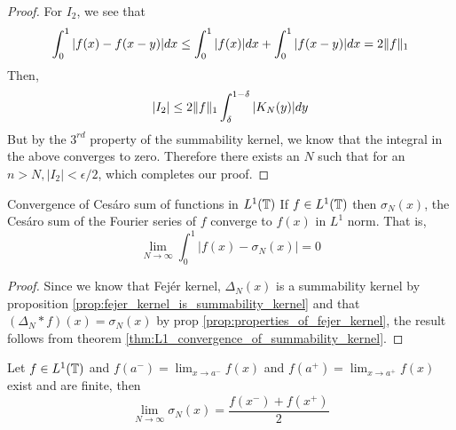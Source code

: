 \begin{proof}
    For $I_2$, we see that 
    \begin{displaymath}
      \int_0^1 |f(x) - f(x-y)|dx \le \int_0^1 |f(x)| dx + \int_0^1 |f(x-y)| dx = 2\lVert f\rVert_1
    \end{displaymath}
  Then,
  \begin{displaymath}
    |I_2| \le 2\lVert f\rVert_1 \int_{\delta}^{1-\delta} |K_N(y)|dy
  \end{displaymath}
But by the $3^{rd}$ property of the summability kernel, we know that the integral in the above converges to zero. Therefore there exists an $N$ such that for an $n>N, |I_2|< \epsilon/2$, which completes our proof.
  \end{proof}

  \begin{corollary}{Convergence of Ces\'aro sum of functions in $L^1(\mathbb T)$}
    If $f\in L^1(\mathbb T)$ then $\sigma_N(x)$, the Ces\'aro sum of the Fourier series of $f$ converge to $f(x)$ in $L^1$ norm. That is, 
    \begin{displaymath}
      \lim_{N\to \infty} \int_0^1 \left|f(x) - \sigma_N(x)\right| = 0
    \end{displaymath}
  \end{corollary}
  \begin{proof}
    Since we know that Fej\'er kernel, $\Delta_N(x)$ is a summability kernel by proposition \ref{prop:fejer_kernel_is_summability_kernel} and that $(\Delta_N*f)(x) = \sigma_N(x)$ by prop \ref{prop:properties_of_fejer_kernel}, the result follows from theorem \ref{thm:L1_convergence_of_summability_kernel}.
  \end{proof}

  \begin{theorem}
    \label{thm:fejer_theorem}
    Let $f \in L^1(\mathbb T)$ and $f(a^-) = \lim_{x \to a^-} f(x)$ and $f(a^+) = \lim_{x \to a^+} f(x)$ exist and are finite, then
    $$\lim_{ N\to \infty} \sigma_N(x) = \frac{f(x^-) + f(x^+)}{2}$$
  \end{theorem}

